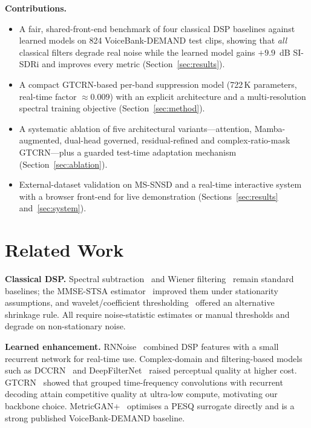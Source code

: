 \documentclass[runningheads]{llncs}
\begin{document}
\medskip\noindent\textbf{Contributions.}
\begin{itemize}
  \item A fair, shared-front-end benchmark of four classical DSP baselines
        against learned models on 824 VoiceBank-DEMAND test clips, showing that
        \emph{all} classical filters degrade real noise while the learned model
        gains $+9.9$~dB SI-SDRi and improves every metric
        (Section~\ref{sec:results}).
  \item A compact GTCRN-based per-band suppression model (722\,K parameters,
        real-time factor $\approx 0.009$) with an explicit architecture and a
        multi-resolution spectral training objective
        (Section~\ref{sec:method}).
  \item A systematic ablation of five architectural variants---attention,
        Mamba-augmented, dual-head governed, residual-refined and
        complex-ratio-mask GTCRN---plus a guarded test-time adaptation
        mechanism (Section~\ref{sec:ablation}).
  \item External-dataset validation on MS-SNSD and a real-time interactive
        system with a browser front-end for live demonstration
        (Sections~\ref{sec:results} and~\ref{sec:system}).
\end{itemize}

\section{Related Work}
\textbf{Classical DSP.} Spectral subtraction~\cite{boll} and Wiener
filtering~\cite{lim} remain standard baselines; the MMSE-STSA
estimator~\cite{ephraim} improved them under stationarity assumptions, and
wavelet/coefficient thresholding~\cite{donoho} offered an alternative
shrinkage rule. All require noise-statistic estimates or manual thresholds and
degrade on non-stationary noise.

\textbf{Learned enhancement.} RNNoise~\cite{rnnoise} combined DSP features with
a small recurrent network for real-time use. Complex-domain and
filtering-based models such as DCCRN~\cite{dccrn} and
DeepFilterNet~\cite{deepfilternet} raised perceptual quality at higher cost.
GTCRN~\cite{gtcrn} showed that grouped time-frequency convolutions with
recurrent decoding attain competitive quality at ultra-low compute, motivating
our backbone choice. MetricGAN+~\cite{metricgan} optimises a
PESQ surrogate directly and is a strong published VoiceBank-DEMAND baseline.
\end{document}
